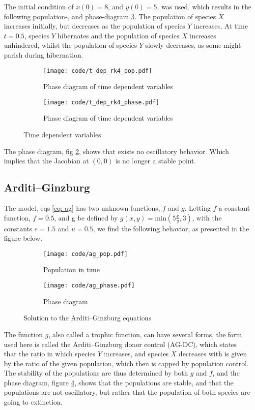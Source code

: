 \documentclass[a4paper]{article}
\begin{document}
The initial condition of $x(0) = 8$, and $y(0) = 5$, was used, which results in the following population-, and phase-diagram \ref{fig: time dep}. The population of species $X$ increases initially, but decreases as the population of species $Y$ increases. At time $t = 0.5$, species $Y$ hibernates and the population of species $X$ increases unhindered, whilst the population of species $Y$ slowly decreases, as some might parish during hibernation.
\begin{figure}[H]
    \centering
    \begin{subfigure}{0.45\textwidth}
        \texttt{[image: code/t\_dep\_rk4\_pop.pdf]}
        \caption{Phase diagram of time dependent variables}
        \label{fig: time dep pop}
    \end{subfigure}
    \hfill
    \begin{subfigure}{0.45\textwidth}
        \texttt{[image: code/t\_dep\_rk4\_phase.pdf]}
        \caption{Phase diagram of time dependent variables}
        \label{fig: time dep phase}
    \end{subfigure}
    \caption{Time dependent variables}
    \label{fig: time dep}
\end{figure}\noindent
The phase diagram, fig \ref{fig: time dep phase}, shows that exists no oscillatory behavior. Which implies that the Jacobian at $(0,0)$ is no longer a stable point.
\subsection{Arditi–Ginzburg}
The model, eqs \eqref{eq: ag} has two unknown functions, $f$ and $g$. Letting $f$ a constant function, $f = 0.5$, and g be defined by $g(x,y) = \text{min}\left(5\frac{x}{y}, 3\right)$, with the constants $e = 1.5$ and $u = 0.5$, we find the following behavior, as presented in the figure below.
\begin{figure}[H]
    \centering
    \begin{subfigure}{0.45\textwidth}
        \texttt{[image: code/ag\_pop.pdf]}
        \caption{Population in time}
    \end{subfigure}
    \hfill
    \begin{subfigure}{0.45\textwidth}
        \texttt{[image: code/ag\_phase.pdf]}
        \caption{Phase diagram}
        \label{fig: ag phase}
    \end{subfigure}
    \caption{Solution to the Arditi–Ginzburg equations}
    \label{fig: ag}
\end{figure}\noindent
The function $g$, also called a trophic function, can have several forms, the form used here is called the Arditi–Ginzburg donor control (AG-DC), which states that the ratio in which species $Y$ increases, and species $X$ decreases with is given by the ratio of the given population, which then is capped by population control.
The stability of the populations are thus determined by both $g$ and $f$, and the phase diagram, figure \ref{fig: ag phase}, shows that the populations are stable, and that the populations are not oscillatory, but rather that the population of both species are going to extinction.
\end{document}
